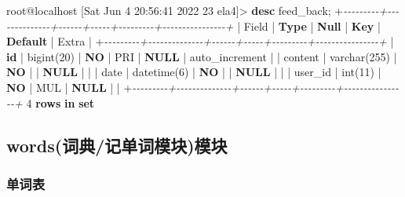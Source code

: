 \documentclass[
]{article}
\newenvironment{Shaded}{}{}
\newcommand{\CharTok}[1]{\textcolor[rgb]{0.25,0.44,0.63}{#1}}
\newcommand{\CommentTok}[1]{\textcolor[rgb]{0.38,0.63,0.69}{\textit{#1}}}
\newcommand{\DataTypeTok}[1]{\textcolor[rgb]{0.56,0.13,0.00}{#1}}
\newcommand{\DecValTok}[1]{\textcolor[rgb]{0.25,0.63,0.44}{#1}}
\newcommand{\KeywordTok}[1]{\textcolor[rgb]{0.00,0.44,0.13}{\textbf{#1}}}
\newcommand{\NormalTok}[1]{#1}
\newcommand{\OperatorTok}[1]{\textcolor[rgb]{0.40,0.40,0.40}{#1}}
\begin{document}
\begin{Shaded}
\begin{Highlighting}[]
\NormalTok{root@localhost [Sat Jun  }\DecValTok{4} \DecValTok{20}\CharTok{:56:41} \DecValTok{2022} \DecValTok{23}\NormalTok{ ela4]}\OperatorTok{\textgreater{}} \KeywordTok{desc}\NormalTok{ feed\_back;}
\OperatorTok{+}\CommentTok{{-}{-}{-}{-}{-}{-}{-}{-}{-}+{-}{-}{-}{-}{-}{-}{-}{-}{-}{-}{-}{-}{-}{-}+{-}{-}{-}{-}{-}{-}+{-}{-}{-}{-}{-}+{-}{-}{-}{-}{-}{-}{-}{-}{-}+{-}{-}{-}{-}{-}{-}{-}{-}{-}{-}{-}{-}{-}{-}{-}{-}+}
\NormalTok{| Field   | }\KeywordTok{Type}\NormalTok{         | }\KeywordTok{Null}\NormalTok{ | }\KeywordTok{Key}\NormalTok{ | }\KeywordTok{Default}\NormalTok{ | Extra          |}
\OperatorTok{+}\CommentTok{{-}{-}{-}{-}{-}{-}{-}{-}{-}+{-}{-}{-}{-}{-}{-}{-}{-}{-}{-}{-}{-}{-}{-}+{-}{-}{-}{-}{-}{-}+{-}{-}{-}{-}{-}+{-}{-}{-}{-}{-}{-}{-}{-}{-}+{-}{-}{-}{-}{-}{-}{-}{-}{-}{-}{-}{-}{-}{-}{-}{-}+}
\NormalTok{| }\KeywordTok{id}\NormalTok{      | bigint(}\DecValTok{20}\NormalTok{)   | }\KeywordTok{NO}\NormalTok{   | PRI | }\KeywordTok{NULL}\NormalTok{    | auto\_increment |}
\NormalTok{| content | }\DataTypeTok{varchar}\NormalTok{(}\DecValTok{255}\NormalTok{) | }\KeywordTok{NO}\NormalTok{   |     | }\KeywordTok{NULL}\NormalTok{    |                |}
\NormalTok{| }\DataTypeTok{date}\NormalTok{    | datetime(}\DecValTok{6}\NormalTok{)  | }\KeywordTok{NO}\NormalTok{   |     | }\KeywordTok{NULL}\NormalTok{    |                |}
\NormalTok{| user\_id | }\DataTypeTok{int}\NormalTok{(}\DecValTok{11}\NormalTok{)      | }\KeywordTok{NO}\NormalTok{   | MUL | }\KeywordTok{NULL}\NormalTok{    |                |}
\OperatorTok{+}\CommentTok{{-}{-}{-}{-}{-}{-}{-}{-}{-}+{-}{-}{-}{-}{-}{-}{-}{-}{-}{-}{-}{-}{-}{-}+{-}{-}{-}{-}{-}{-}+{-}{-}{-}{-}{-}+{-}{-}{-}{-}{-}{-}{-}{-}{-}+{-}{-}{-}{-}{-}{-}{-}{-}{-}{-}{-}{-}{-}{-}{-}{-}+}
\DecValTok{4} \KeywordTok{rows} \KeywordTok{in} \KeywordTok{set}
\end{Highlighting}
\end{Shaded}

\hypertarget{wordsux8bcdux5178ux8bb0ux5355ux8bcdux6a21ux5757ux6a21ux5757}{%
\subsection{words(词典/记单词模块)模块}\label{wordsux8bcdux5178ux8bb0ux5355ux8bcdux6a21ux5757ux6a21ux5757}}

\hypertarget{ux5355ux8bcdux8868}{%
\subsubsection{单词表}\label{ux5355ux8bcdux8868}}
\end{document}
